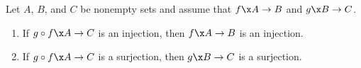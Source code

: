 \begin{activity}
\begin{theorem} \label{T:morecompositefunctions}
Let  $A$, $B$, and $C$ be nonempty sets and assume that $f\x A \to B$ and  $g\x B \to C$.

\begin{enumerate}
\item If  $g \circ f\x A \to C$  is an injection, then  $f\x A \to B$  is an injection. \label{T:morecompositefunctions1}

\item If  $g \circ f\x A \to C$ is a surjection, then  $g\x B \to C$ is a surjection. \label{T:morecompositefunctions2}
\end{enumerate}
\end{theorem}
\end{activity}
\hbreak










\endinput

\begin{center}
\setlength{\unitlength}{0.5cm}
\begin{picture}(18,14)
\put(2,6.5){\oval(3,11)}
\put(8,6.5){\oval(3,11)}
\put(14,6.5){\oval(3,11)}

\put(2,2){\circle*{.5}}
\put(2,5){\circle*{.5}}
\put(2,8){\circle*{.5}}
\put(2,11){\circle*{.5}}

\put(8,5){\circle*{.5}}
\put(8,8){\circle*{.5}}
\put(8,11){\circle*{.5}}

\put(14,2){\circle*{.5}}
\put(14,5){\circle*{.5}}
\put(14,8){\circle*{.5}}
\put(14,11){\circle*{.5}}

\put(1.1,11){$a$}
\put(1.1,8){$b$}
\put(1.1,5){$c$}
\put(1.1,2){$d$}

\put(8,11.5){$p$}
\put(8,8.5){$q$}
\put(8,5.5){$r$}

\put(14.5,11){$s$}
\put(14.5,8){$t$}
\put(14.5,5){$u$}
\put(14.5,2){$v$}

\put(2,12.5){$A$}
\put(8,12.5){$B$}
\put(14,12.5){$C$}


\put(3,12.8){\vector(1,0){4.7}}
\put(9,12.8){\vector(1,0){4.7}}

\put(5,13.2){$f$}
\put(11,13.2){$g$}

\put(2.5,11){\vector(1,0){5}}
\put(2.5,8){\vector(2,1){5}}
\put(2.5,5){\vector(1,0){5}}
\put(2.5,2.3){\vector(1,1){5.3}}

\put(8.5,10.8){\vector(2,-1){5.2}}
\put(8.5,7.8){\vector(1,-1){5.3}}
\put(8.5,5){\vector(1,0){5}}

\end{picture}
\end{center}

